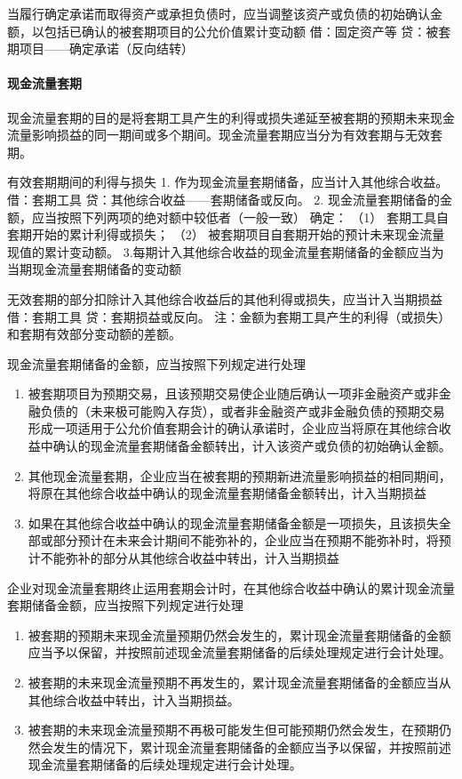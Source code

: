 \documentclass[UTF8,12pt]{ctexart}
\numberwithin{equation}{section} %
\numberwithin{figure}{section}
\numberwithin{table}{section}
\begin{document}
	当履行确定承诺而取得资产或承担负债时，应当调整该资产或负债的初始确认金额，以包括已确认的被套期项目的公允价值累计变动额
	借：固定资产等
	贷：被套期项目——确定承诺（反向结转）
	
	
	\paragraph{现金流量套期}
	现金流量套期的目的是将套期工具产生的利得或损失递延至被套期的预期未来现金流量影响损益的同一期间或多个期间。现金流量套期应当分为有效套期与无效套期。
	
	有效套期期间的利得与损失
	1.	作为现金流量套期储备，应当计入其他综合收益。借：套期工具
	贷：其他综合收益——套期储备或反向。
	2.	现金流量套期储备的金额，应当按照下列两项的绝对额中较低者（一般一致） 确定：
	（1）	套期工具自套期开始的累计利得或损失；
	（2）	被套期项目自套期开始的预计未来现金流量现值的累计变动额。
	3.每期计入其他综合收益的现金流量套期储备的金额应当为当期现金流量套期储备的变动额
	
	无效套期的部分扣除计入其他综合收益后的其他利得或损失，应当计入当期损益借：套期工具
	贷：套期损益或反向。
	注：金额为套期工具产生的利得（或损失）和套期有效部分变动额的差额。
	
	现金流量套期储备的金额，应当按照下列规定进行处理
	\begin{enumerate}
		\item 被套期项目为预期交易，且该预期交易使企业随后确认一项非金融资产或非金融负债的（未来极可能购入存货），或者非金融资产或非金融负债的预期交易形成一项适用于公允价值套期会计的确认承诺时，企业应当将原在其他综合收益中确认的现金流量套期储备金额转出，计入该资产或负债的初始确认金额。
		
		\item 其他现金流量套期，企业应当在被套期的预期新进流量影响损益的相同期间，将原在其他综合收益中确认的现金流量套期储备金额转出，计入当期损益
		
		\item 如果在其他综合收益中确认的现金流量套期储备金额是一项损失，且该损失全部或部分预计在未来会计期间不能弥补的，企业应当在预期不能弥补时，将预计不能弥补的部分从其他综合收益中转出，计入当期损益
	\end{enumerate}
	
	企业对现金流量套期终止运用套期会计时，在其他综合收益中确认的累计现金流量套期储备金额，应当按照下列规定进行处理
	\begin{enumerate}
		\item 被套期的预期未来现金流量预期仍然会发生的，累计现金流量套期储备的金额应当予以保留，并按照前述现金流量套期储备的后续处理规定进行会计处理。
		
		\item 被套期的未来现金流量预期不再发生的，累计现金流量套期储备的金额应当从其他综合收益中转出，计入当期损益。
		
		\item 被套期的未来现金流量预期不再极可能发生但可能预期仍然会发生，在预期仍然会发生的情况下，累计现金流量套期储备的金额应当予以保留，并按照前述现金流量套期储备的后续处理规定进行会计处理。
	\end{enumerate}
	
\end{document}
